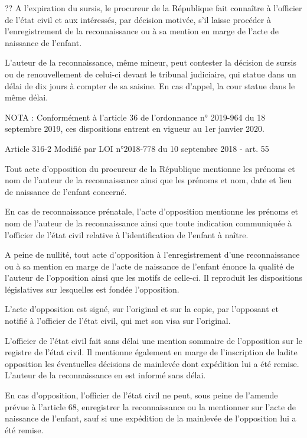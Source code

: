 \documentclass[
  12pt,
]{book}
\begin{document}
\begin{encadre}{??}
A l'expiration du sursis, le procureur de la République fait connaître à l'officier de l'état civil et aux intéressés, par décision motivée, s'il laisse procéder à l'enregistrement de la reconnaissance ou à sa mention en marge de l'acte de naissance de l'enfant.

L'auteur de la reconnaissance, même mineur, peut contester la décision de sursis ou de renouvellement de celui-ci devant le tribunal judiciaire, qui statue dans un délai de dix jours à compter de sa saisine. En cas d'appel, la cour statue dans le même délai.

NOTA :
Conformément à l'article 36 de l'ordonnance n° 2019-964 du 18 septembre 2019, ces dispositions entrent en vigueur au 1er janvier 2020.

Article 316-2
Modifié par LOI n°2018-778 du 10 septembre 2018 - art. 55

Tout acte d'opposition du procureur de la République mentionne les prénoms et nom de l'auteur de la reconnaissance ainsi que les prénoms et nom, date et lieu de naissance de l'enfant concerné.

En cas de reconnaissance prénatale, l'acte d'opposition mentionne les prénoms et nom de l'auteur de la reconnaissance ainsi que toute indication communiquée à l'officier de l'état civil relative à l'identification de l'enfant à naître.

A peine de nullité, tout acte d'opposition à l'enregistrement d'une reconnaissance ou à sa mention en marge de l'acte de naissance de l'enfant énonce la qualité de l'auteur de l'opposition ainsi que les motifs de celle-ci. Il reproduit les dispositions législatives sur lesquelles est fondée l'opposition.

L'acte d'opposition est signé, sur l'original et sur la copie, par l'opposant et notifié à l'officier de l'état civil, qui met son visa sur l'original.

L'officier de l'état civil fait sans délai une mention sommaire de l'opposition sur le registre de l'état civil. Il mentionne également en marge de l'inscription de ladite opposition les éventuelles décisions de mainlevée dont expédition lui a été remise. L'auteur de la reconnaissance en est informé sans délai.

En cas d'opposition, l'officier de l'état civil ne peut, sous peine de l'amende prévue à l'article 68, enregistrer la reconnaissance ou la mentionner sur l'acte de naissance de l'enfant, sauf si une expédition de la mainlevée de l'opposition lui a été remise.


\end{encadre}
\end{document}

